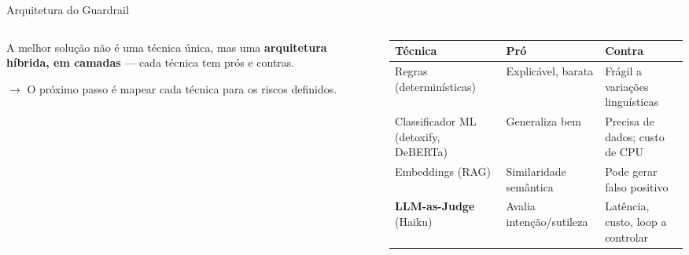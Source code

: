 \documentclass[aspectratio=169,11pt]{beamer}
\begin{document}
\begin{frame}{Arquitetura do Guardrail}
  \begin{columns}[t]
    \begin{column}{0.42\textwidth}
      A melhor solução não é uma técnica única, mas uma \textbf{arquitetura
      híbrida, em camadas} --- cada técnica tem prós e contras.
      \vspace{1em}

      \small $\rightarrow$ O próximo passo é mapear cada técnica para os riscos
      definidos.
    \end{column}
    \begin{column}{0.58\textwidth}
      \scriptsize
      \begin{tabular}{@{}p{2.3cm}p{2.0cm}p{2.3cm}@{}}
        \toprule
        \textbf{Técnica} & \textbf{Pró} & \textbf{Contra}\\
        \midrule
        Regras (determinísticas) & Explicável, barata & Frágil a variações linguísticas\\
        \addlinespace
        Classificador ML (detoxify, DeBERTa) & Generaliza bem & Precisa de dados; custo de CPU\\
        \addlinespace
        Embeddings (RAG) & Similaridade semântica & Pode gerar falso positivo\\
        \addlinespace
        \textbf{LLM-as-Judge} (Haiku) & Avalia intenção/sutileza & Latência, custo, loop a controlar\\
        \bottomrule
      \end{tabular}
    \end{column}
  \end{columns}
\end{frame}
\end{document}

